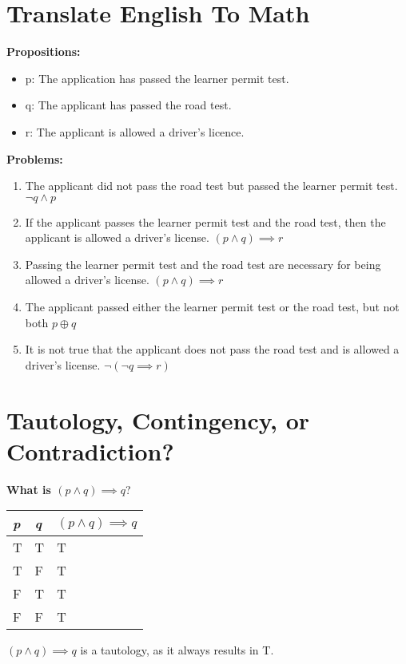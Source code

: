 \documentclass[a4paper]{article}
\begin{document}
\bigskip


\section{Translate English To Math}
\textbf{Propositions:}
\begin{itemize}
    \item p: The application has passed the learner permit test.
    \item q: The applicant has passed the road test.
    \item r: The applicant is allowed a driver's licence.
\end{itemize}
\textbf{Problems:}
\begin{enumerate}\bfseries
    \item The applicant did not pass the road test but passed the learner permit test. $\neg q \land p$ \\
    \item If the applicant passes the learner permit test and the road test, then the applicant is allowed a driver's license. $(p \land q) \implies r$ \\
    \item Passing the learner permit test and the road test are necessary for being allowed a driver's license. $(p \land q) \implies r$ \\
    \item The applicant passed either the learner permit test or the road test, but not both $p \oplus q$ \\
    \item It is not true that the applicant does not pass the road test and is allowed a driver's license. $\neg(\neg q \implies r)$
\end{enumerate}

\bigskip


\section{Tautology, Contingency, or Contradiction?}
\textbf{What is \boldmath $(p \land q) \implies q$}? \unboldmath\\
\begin{center}
\begin{tabularx}{0.8\textwidth}{| Y | Y | Y |}
    \hline
    \textbf{\textit{p}} & \textbf{\textit{q}} & \boldmath $(p \land q) \implies q$ \unboldmath \\ [1ex]
    \hline
    T & T & T \\
    \hline
    T & F & T \\
    \hline
    F & T & T \\
    \hline
    F & F & T \\
    \hline
\end{tabularx}
\end{center}
$(p \land q) \implies q$ is a tautology, as it always results in T. \\
\end{document}
